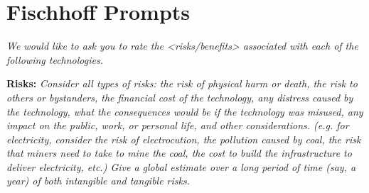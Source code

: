 \documentclass{acm_proc_article-sp}
\begin{document}








\appendix
\section{Fischhoff Prompts}
\label{sec:prompt} 

\textit{We would like to ask you to rate the <risks/benefits> associated with each of the following technologies.}

{\bf Risks:} \textit{Consider all types of risks: the risk of physical harm or death, the risk to others or bystanders, the financial cost of the technology, any distress caused by the technology, what the consequences would be if the technology was misused, any impact on the public, work, or personal life, and other considerations. (e.g. for electricity, consider the risk of electrocution, the pollution caused by coal, the risk that miners need to take to mine the coal, the cost to build the infrastructure to deliver electricity, etc.) Give a global estimate over a long period of time (say, a year) of both intangible and tangible risks.} \\[-.6cm]
\end{document}
